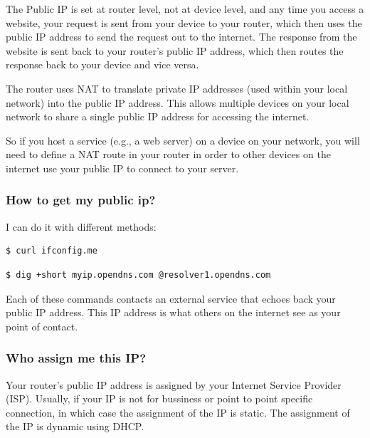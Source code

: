 \documentclass{article}
\newenvironment{codetemplate}[1][]{%
  \mybasecolorbox[#1]
  \itshape
}{%
  \endmybasecolorbox
}
\begin{document}
The Public IP is set at router level, not at device level, and any time you access a website, your request is sent from your device to your router, which then uses the public IP address to send the request out to the internet. The response from the website is sent back to your router's public IP address, which then routes the response back to your device and vice versa.

The router uses NAT to translate private IP addresses (used within your local network) into the public IP address. This allows multiple devices on your local network to share a single public IP address for accessing the internet.

So if you host a service (e.g., a web server) on a device on your network, you will need to define a NAT route in your router in order to other devices on the internet use your public IP to connect to your server.

\subsubsection{How to get my public ip?}

I can do it with different methods:

\begin{codetemplate}{}
\begin{verbatim}
$ curl ifconfig.me
\end{verbatim}
\end{codetemplate}

\begin{codetemplate}{}
\begin{verbatim}
$ dig +short myip.opendns.com @resolver1.opendns.com
\end{verbatim}
\end{codetemplate}

Each of these commands contacts an external service that echoes back your public IP address. This IP address is what others on the internet see as your point of contact.

\subsubsection{Who assign me this IP?}

Your router's public IP address is assigned by your Internet Service Provider (ISP). Usually, if your IP is not for bussiness or point to point specific connection, in which case the assignment of the IP is static. The assignment of the IP is dynamic using DHCP.
\end{document}
